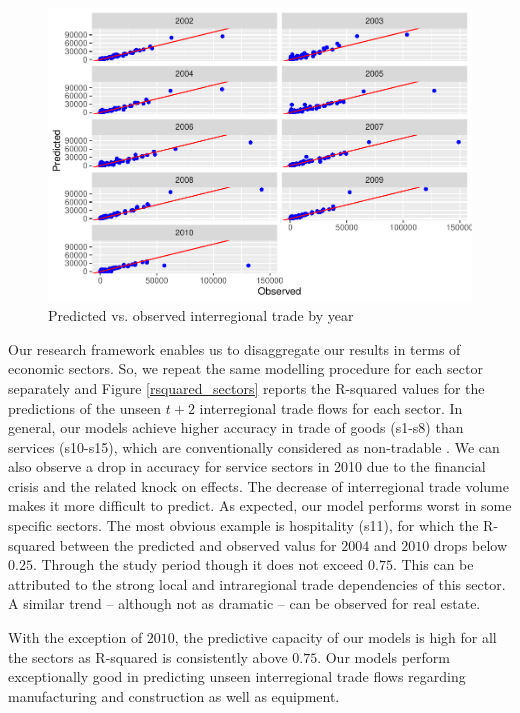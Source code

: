 \documentclass[]{interact}
\theoremstyle{plain}%
\theoremstyle{definition}
\theoremstyle{remark}
\begin{document}
\begin{figure}[p]
\includegraphics[width=1\linewidth]{hl_v2--and-_files/figure-latex/unnamed-chunk-7-1} \caption{\label{prediction}Predicted vs. observed interregional trade by year}\label{fig:unnamed-chunk-7}
\end{figure}

Our research framework enables us to disaggregate our results in terms
of economic sectors. So, we repeat the same modelling procedure for each
sector separately and Figure \ref{rsquared_sectors} reports the
R-squared values for the predictions of the unseen \(t + 2\)
interregional trade flows for each sector. In general, our models
achieve higher accuracy in trade of goods (s1-s8) than services
(s10-s15), which are conventionally considered as non-tradable
\citep{jensen2005}. We can also observe a drop in accuracy for service
sectors in 2010 due to the financial crisis and the related knock on
effects. The decrease of interregional trade volume makes it more
difficult to predict. As expected, our model performs worst in some
specific sectors. The most obvious example is hospitality (s11), for
which the R-squared between the predicted and observed valus for
\(2004\) and \(2010\) drops below \(0.25\). Through the study period
though it does not exceed \(0.75\). This can be attributed to the strong
local and intraregional trade dependencies of this sector. A similar
trend -- although not as dramatic -- can be observed for real estate.

With the exception of \(2010\), the predictive capacity of our models is
high for all the sectors as R-squared is consistently above \(0.75\).
Our models perform exceptionally good in predicting unseen interregional
trade flows regarding manufacturing and construction as well as
equipment.
\end{document}
